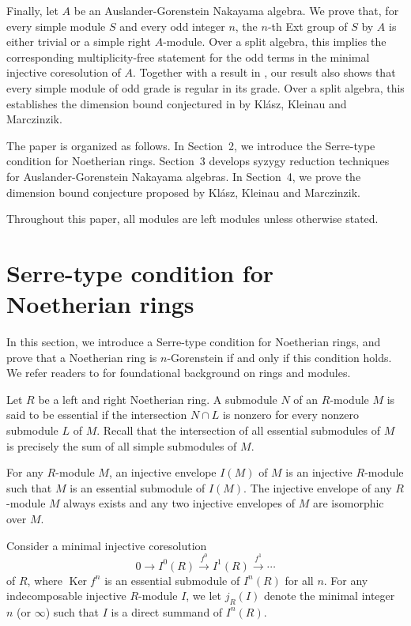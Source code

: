 \documentclass[a4paper,reqno]{amsart}
\numberwithin{equation}{section}
\theoremstyle{plain}
\theoremstyle{definition}
\theoremstyle{remark}
\DeclareMathOperator{\Ker}{Ker}
\newcommand{\lto}{\longrightarrow}
\renewcommand{\-}{\mbox{-}}
\begin{document}
Finally, let \(A\) be an Auslander-Gorenstein Nakayama algebra.  
We prove that, for every simple module \(S\) and every odd integer \(n\), 
the \(n\)-th Ext group  of \(S\) by \(A\) is either trivial or a 
simple right \(A\)-module. 
Over a split algebra, this implies the corresponding multiplicity-free statement
for the odd terms in the minimal injective coresolution of \(A\). 
Together with a result in \cite{KKM26}, our result
also shows that every simple module of odd grade is regular in its grade.
Over a split algebra, 
this establishes the dimension bound conjectured in \cite{KKM26}
by  Kl\'asz, Kleinau and Marczinzik.


The paper is organized as follows.
In Section~2, we introduce the Serre-type condition for Noetherian rings. 
Section~3 develops syzygy reduction techniques for Auslander-Gorenstein Nakayama algebras. 
In Section~4, we prove the dimension bound conjecture proposed by  Kl\'asz, Kleinau and Marczinzik.

Throughout this paper, all modules are left modules unless otherwise stated.


\section{Serre-type condition for Noetherian rings}
In this section, we introduce a  Serre-type condition for Noetherian rings, 
and prove that a Noetherian ring is \(n\)-Gorenstein if and only if this condition holds. 
We refer readers  to  \cite{Lam99} for foundational background  on rings and modules.


Let \(R\) be a left and right Noetherian ring. 
A submodule \(N\) of an \(R\)-module \(M\) is said to be {essential} 
if the intersection \(N\cap L\) is nonzero for every nonzero submodule \(L\) of \(M\).
Recall that the intersection of all essential submodules of \(M\) is 
precisely the sum of all simple submodules of \(M\).


For any \(R\)-module \(M\), an injective envelope \(I(M)\) of \(M\) 
is an injective \(R\)-module such that \(M\) is an essential submodule of \(I(M)\).
The injective envelope of any \(R\)-module \(M\) always exists and 
any two injective envelopes of \(M\) are isomorphic over \(M\).

Consider a minimal injective coresolution 
\begin{equation*}
    0 \to I^0(R)\overset{f^0}\lto I^1(R)\overset{f^1}\lto \cdots
\end{equation*}
of \(R\), 
where \(\Ker{f^n}\) is an essential submodule of \(I^n(R)\) for all \(n\).
For any indecomposable injective \(R\)-module  \(I\),
we let \(j_R(I)\) denote the minimal integer \(n\) (or \(\infty\)) such that 
\(I\) is a direct summand of \(I^n(R)\).
\end{document}

